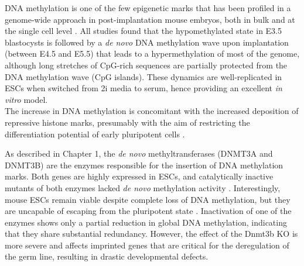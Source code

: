DNA methylation is one of the few epigenetic marks that has been profiled in a genome-wide approach in post-implantation mouse embryos, both in bulk and at the single cell level \cite{Auclar2014,Zhang2017,Dai2016,Rulands2018}.
All studies found that the hypomethylated state in E3.5 blastocysts is followed by a \textit{de novo} DNA methylation wave upon implantation (between E4.5 and E5.5) that leads to a hypermethylation of most of the genome, although long stretches of CpG-rich sequences are partially protected from the DNA methylation wave (CpG islands). These dynamics are well-replicated in ESCs when switched from 2i media to serum, hence providing an excellent \textit{in vitro} model.\\
The increase in DNA methylation is concomitant with the increased deposition of repressive histone marks, presumably with the aim of restricting the differentiation potential of early pluripotent cells \cite{Atlasi2017}.

As described in Chapter 1, the \textit{de novo} methyltransferases (DNMT3A and DNMT3B) are the enzymes responsible for the insertion of DNA methylation marks. Both genes are highly expressed in ESCs, and catalytically inactive mutants of both enzymes lacked \textit{de novo} methylation activity \cite{Auclair2014,Okano1999}. Interestingly, mouse ESCs remain viable despite complete loss of DNA methylation, but they are uncapable of escaping from the pluripotent state \cite{XXX}. Inactivation of one of the enzymes shows only a partial reduction in global DNA methylation, indicating that they share substantial redundancy. However, the effect of the Dnmt3b KO is more severe and affects imprinted genes that are critical for the deregulation of the germ line, resulting in drastic developmental defects.\\

